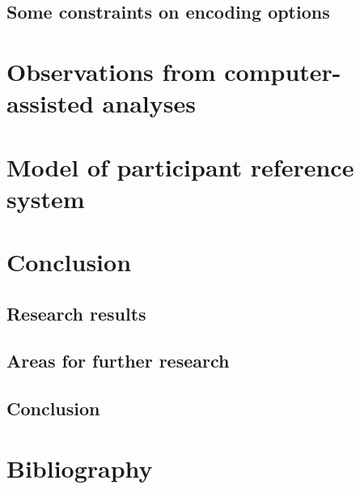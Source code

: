 \documentclass[twoside,a4paper,10pt]{article}
\begin{document}
\subsection{Some constraints on encoding options}

\section{Observations from computer-assisted analyses}
\section{Model of participant reference system}
\newpage
\section{Conclusion}
\subsection{Research results}
\subsection{Areas for further research}
\subsection{Conclusion}
\newpage
\section*{Bibliography}
\printbibliography
\end{document}
